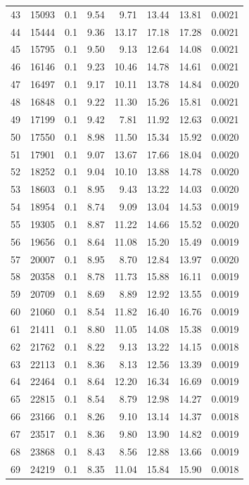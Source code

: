 \documentclass[11pt,a4paper]{article}
\begin{document}
\begin{center}
\begin{longtable}{@{}rrrrrrrr@{}}
43 & 15093 & 0.1 & 9.54 & 9.71 & 13.44 & 13.81 & 0.0021 \\
44 & 15444 & 0.1 & 9.36 & 13.17 & 17.18 & 17.28 & 0.0021 \\
45 & 15795 & 0.1 & 9.50 & 9.13 & 12.64 & 14.08 & 0.0021 \\
46 & 16146 & 0.1 & 9.23 & 10.46 & 14.78 & 14.61 & 0.0021 \\
47 & 16497 & 0.1 & 9.17 & 10.11 & 13.78 & 14.84 & 0.0020 \\
48 & 16848 & 0.1 & 9.22 & 11.30 & 15.26 & 15.81 & 0.0021 \\
49 & 17199 & 0.1 & 9.42 & 7.81 & 11.92 & 12.63 & 0.0021 \\
50 & 17550 & 0.1 & 8.98 & 11.50 & 15.34 & 15.92 & 0.0020 \\
51 & 17901 & 0.1 & 9.07 & 13.67 & 17.66 & 18.04 & 0.0020 \\
52 & 18252 & 0.1 & 9.04 & 10.10 & 13.88 & 14.78 & 0.0020 \\
53 & 18603 & 0.1 & 8.95 & 9.43 & 13.22 & 14.03 & 0.0020 \\
54 & 18954 & 0.1 & 8.74 & 9.09 & 13.04 & 14.53 & 0.0019 \\
55 & 19305 & 0.1 & 8.87 & 11.22 & 14.66 & 15.52 & 0.0020 \\
56 & 19656 & 0.1 & 8.64 & 11.08 & 15.20 & 15.49 & 0.0019 \\
57 & 20007 & 0.1 & 8.95 & 8.70 & 12.84 & 13.97 & 0.0020 \\
58 & 20358 & 0.1 & 8.78 & 11.73 & 15.88 & 16.11 & 0.0019 \\
59 & 20709 & 0.1 & 8.69 & 8.89 & 12.92 & 13.55 & 0.0019 \\
60 & 21060 & 0.1 & 8.54 & 11.82 & 16.40 & 16.76 & 0.0019 \\
61 & 21411 & 0.1 & 8.80 & 11.05 & 14.08 & 15.38 & 0.0019 \\
62 & 21762 & 0.1 & 8.22 & 9.13 & 13.22 & 14.15 & 0.0018 \\
63 & 22113 & 0.1 & 8.36 & 8.13 & 12.56 & 13.39 & 0.0019 \\
64 & 22464 & 0.1 & 8.64 & 12.20 & 16.34 & 16.69 & 0.0019 \\
65 & 22815 & 0.1 & 8.54 & 8.79 & 12.98 & 14.27 & 0.0019 \\
66 & 23166 & 0.1 & 8.26 & 9.10 & 13.14 & 14.37 & 0.0018 \\
67 & 23517 & 0.1 & 8.36 & 9.80 & 13.90 & 14.82 & 0.0019 \\
68 & 23868 & 0.1 & 8.43 & 8.56 & 12.88 & 13.66 & 0.0019 \\
69 & 24219 & 0.1 & 8.35 & 11.04 & 15.84 & 15.90 & 0.0018 \\

\end{longtable}
\end{center}
\end{document}
